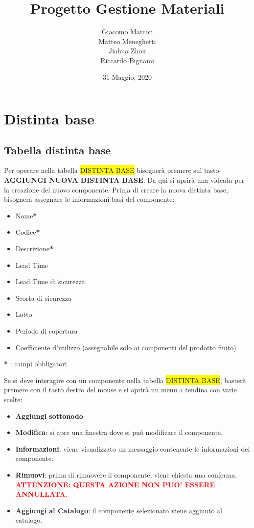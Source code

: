 \documentclass[a4paper,12pt]{book}
\newcommand{\coloredbold}[2]{\textcolor{#1}{\textbf{#2}}}
\begin{document}
\title{Progetto Gestione Materiali}
\author
{
	Giacomo Marcon
	\\ Matteo Meneghetti  
	\\ Jiahua Zhou
	\\ Riccardo Bignami
}

\date{31 Maggio, 2020}
\maketitle


\newpage
\tableofcontents{}  
\chapter{Distinta base}   
\section{Tabella distinta base}
Per operare nella tabella \colorbox{yellow}{DISTINTA BASE} bisognerà premere sul tasto \textbf{AGGIUNGI NUOVA DISTINTA BASE}. Da qui si aprirà una videata per la creazione del nuovo componente.
Prima di creare la nuova distinta base, bisognerà assegnare le informazioni basi del componente:

\begin{itemize}
	\item Nome\textbf{*} 
	\item Codice\textbf{*} 
	\item Descrizione\textbf{*} 
	\item Lead Time
	\item Lead Time di sicurezza
	\item Scorta di sicurezza
	\item Lotto
	\item Periodo di copertura 
	\item Coefficiente d’utilizzo (assegnabile solo ai componenti del prodotto finito)        
\end{itemize}

\begin{flushright}
	\textbf{*}   : campi obbligatori
\end{flushright}

Se si deve interagire con un componente nella tabella \colorbox{yellow}{DISTINTA BASE}, basterà premere con il tasto destro del mouse e si aprirà un menu a tendina con varie scelte:

\begin{itemize}
	\item \textbf{Aggiungi sottonodo}
	\item \textbf{Modifica}: si apre una finestra dove si può modificare il componente.
	\item \textbf{Informazioni}: viene visualizzato un messaggio contenente le informazioni del componente.
	\item \textbf{Rimuovi}: prima di rimuovere il componente, viene chiesta una conferma. \coloredbold{red}{ATTENZIONE: QUESTA AZIONE NON PUO’ ESSERE ANNULLATA.}
	\item \textbf{Aggiungi al Catalogo}: il componente selezionato viene aggiunto al catalogo. 
	          
\end{itemize}
\end{document}
